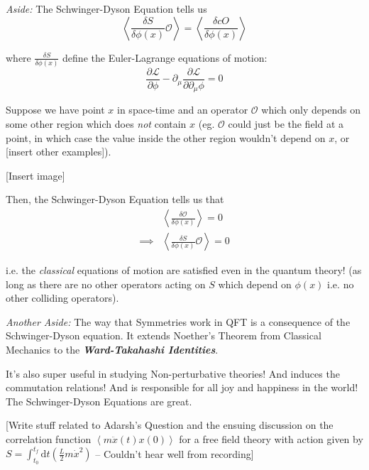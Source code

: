 \documentclass{article}
\newcommand{\cO}{\mathcal{O}}
\newcommand{\mean}[1]{\left\langle #1 \right\rangle}
\begin{document}
\begin{dottedbox}
  \emph{Aside:} The Schwinger-Dyson Equation tells us 
  \[ \mean{\frac{\delta S}{\delta \phi(x)} \cO} = \mean{\frac{\delta cO}{\delta \phi(x)}} \]
  
  where $\frac{\delta S}{\delta \phi(x)}$ define the Euler-Lagrange equations of motion:
  \[ \frac{\partial \mathcal{L}}{\partial \phi} - \partial_{\mu} \frac{\partial \mathcal{L}}{\partial \partial_{\mu} \phi } = 0 \]

  \vskip 0.25cm
  Suppose we have point $x$ in space-time and an operator $\cO$ which only depends on some other region which does \emph{not} contain $x$ (eg. $\cO$ could just be the field at a point, in which case the value inside the other region wouldn't depend on $x$, or [insert other examples]).

  \vskip 0.25cm
  [Insert image]

  \vskip 0.25cm
  Then, the Schwinger-Dyson Equation tells us that 
  \begin{align*}
    &\mean{\frac{\delta \cO}{\delta \phi(x)}} = 0 \\ 
    \implies& \mean{\frac{\delta S}{\delta \phi(x)} \cO} = 0
  \end{align*}

  i.e. the \emph{classical} equations of motion are satisfied even in the quantum theory! (as long as there are no other operators acting on $S$ which depend on $\phi(x)$ i.e. no other colliding operators).
  
\end{dottedbox}

\begin{dottedbox}
  \emph{Another Aside:} The way that Symmetries work in QFT is a consequence of the Schwinger-Dyson equation. It extends Noether's Theorem from Classical Mechanics to the \emph{\textbf{Ward-Takahashi Identities}}.

  \vskip 0.5cm
  It's also super useful in studying Non-perturbative theories! And induces the commutation relations! And is responsible for all joy and happiness in the world! The Schwinger-Dyson Equations are great.
\end{dottedbox}

\vskip 0.5cm
[Write stuff related to Adarsh's Question and the ensuing discussion on the correlation function $\mean{m\ddot{x}(t) x(0)}$ for a free field theory with action given by $S = \int_{t_0}^{t_f} \mathrm{d}t \left( \frac{L}{2} m\dot{x}^2 \right) $ -- Couldn't hear well from recording]
\end{document}
